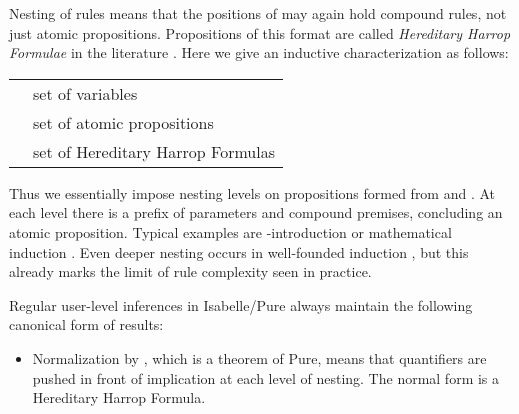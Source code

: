 \begin{isabellebody}
\begin{isamarkuptext}
  Nesting of rules means that the positions of  may
  again hold compound rules, not just atomic propositions.
  Propositions of this format are called \emph{Hereditary Harrop
  Formulae} in the literature \cite{Miller:1991}.  Here we give an
  inductive characterization as follows:

  \medskip
  \begin{tabular}{ll}
  \isa{\isactrlbold x} & set of variables \\
  \isa{\isactrlbold A} & set of atomic propositions \\
  \isa{\isactrlbold H\ \ {\isacharequal}\ \ {\isasymAnd}\isactrlbold x\isactrlsup {\isacharasterisk}{\isachardot}\ \isactrlbold H\isactrlsup {\isacharasterisk}\ {\isasymLongrightarrow}\ \isactrlbold A} & set of Hereditary Harrop Formulas \\
  \end{tabular}
  \medskip

  \noindent Thus we essentially impose nesting levels on propositions
  formed from \isa{{\isasymAnd}} and \isa{{\isasymLongrightarrow}}.  At each level there is a
  prefix of parameters and compound premises, concluding an atomic
  proposition.  Typical examples are \isa{{\isasymlongrightarrow}}-introduction  or mathematical induction .  Even deeper nesting occurs in well-founded
  induction , but this
  already marks the limit of rule complexity seen in practice.

  \medskip Regular user-level inferences in Isabelle/Pure always
  maintain the following canonical form of results:

  \begin{itemize}

  \item Normalization by ,
  which is a theorem of Pure, means that quantifiers are pushed in
  front of implication at each level of nesting.  The normal form is a
  Hereditary Harrop Formula.


\end{itemize}
\end{isamarkuptext}
\end{isabellebody}
